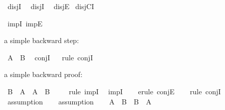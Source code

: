 \begin{isabellebody}
\begin{isamarkuptext}%
\isa{{\isasymor}}%
\end{isamarkuptext}\isamarkuptrue%
\isamarkupfalse%
\ disjI{}\ \isanewline
{}\isamarkupfalse%
\ disjI{}\ \isanewline
{}\isamarkupfalse%
\ disjE\isanewline
{}\isamarkupfalse%
\ disjCI%
\begin{isamarkuptext}%
\isa{{\isasymlongrightarrow}}%
\end{isamarkuptext}\isamarkuptrue%
\isamarkupfalse%
\ impI\ impE%
\isadelimdocument
%
\endisadelimdocument
%
\isatagdocument
%
\isamarkuptrue%
%
\endisatagdocument
{\isafolddocument}%
%
\isadelimdocument
%
\endisadelimdocument
%
\begin{isamarkuptext}%
a simple backward step:%
\end{isamarkuptext}\isamarkuptrue%
\isamarkupfalse%
\ {\isachardoublequoteopen}A\ {\isasymand}\ B{\isachardoublequoteclose}\ \isamarkupfalse%
\ conjI\isanewline
%
\isadelimproof
\ \ %
\endisadelimproof
%
\isatagproof
{}\isamarkupfalse%
{\isacharparenleft}{\kern0pt}rule\ conjI{\isacharparenright}{\kern0pt}\isanewline
\ \ \isamarkupfalse%
%
\endisatagproof
{\isafoldproof}%
%
\isadelimproof
%
\endisadelimproof
%
\begin{isamarkuptext}%
a simple backward proof:%
\end{isamarkuptext}\isamarkuptrue%
\isamarkupfalse%
\ {\isachardoublequoteopen}B\ {\isasymand}\ A\ {\isasymlongrightarrow}\ A\ {\isasymand}\ B{\isachardoublequoteclose}\ \isanewline
%
\isadelimproof
\ \ %
\endisadelimproof
%
\isatagproof
{}\isamarkupfalse%
\ {\isacharparenleft}{\kern0pt}rule\ impI{\isacharparenright}{\kern0pt}\ \isamarkupfalse%
\ impI\isanewline
\ \ \isamarkupfalse%
\ {\isacharparenleft}{\kern0pt}erule\ conjE{\isacharparenright}{\kern0pt}\isanewline
\ \ \isamarkupfalse%
\ {\isacharparenleft}{\kern0pt}rule\ conjI{\isacharparenright}{\kern0pt}\isanewline
\ \ \ \isamarkupfalse%
\ assumption\isanewline
\ \ \isamarkupfalse%
\ assumption\isanewline
\ \ \isamarkupfalse%
%
\endisatagproof
{\isafoldproof}%
%
\isadelimproof
\isanewline
%
\endisadelimproof
\isanewline
\isanewline
{}\isamarkupfalse%
\ {\isachardoublequoteopen}A\ {\isasymor}\ B\ {\isasymlongrightarrow}\ B\ {\isasymor}\ A{\isachardoublequoteclose}\isanewline

\end{isabellebody}
